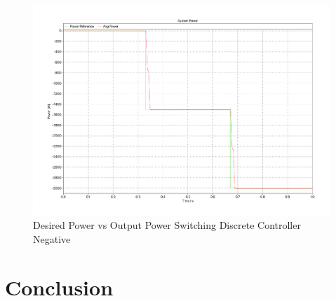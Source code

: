 \documentclass[12pt]{article}
\begin{document}
\begin{figure}[ht]
    \centering{}
    \includegraphics[width=\textwidth, height=0.4\textheight, keepaspectratio]{img/Switching Z-C Power Negative.pdf}
    \caption{Desired Power vs Output Power Switching Discrete Controller Negative}
    \label{fig:switching-z-c-power-negative}
\end{figure}

\section{Conclusion}
\end{document}
